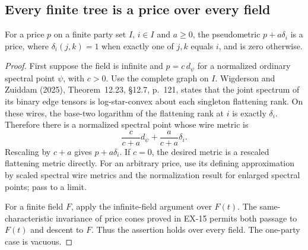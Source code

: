 \subsection{Every finite tree is a price over every field}

\begin{lemma}
\label{pg:pendant}
For a price $p$ on a finite party set $I$, $i\in I$ and $a\geq0$, the
pseudometric $p+a\delta_i$ is a price, where
$\delta_i(j,k)=1$ when exactly one of $j,k$ equals $i$, and is zero otherwise.
\end{lemma}
\begin{proof}
First suppose the field is infinite and $p=c\,d_\psi$ for a normalized
ordinary spectral point $\psi$, with $c>0$. Use the complete graph on $I$.
Wigderson and Zuiddam (2025), Theorem~12.23, \S12.7, p.~121, states that
the joint spectrum of its binary edge tensors is log-star-convex about
each singleton flattening rank. On these wires, the base-two logarithm of
the flattening rank at $i$ is exactly $\delta_i$. Therefore there is a
normalized spectral point whose wire metric is
\[
 \frac{c}{c+a}d_\psi+\frac{a}{c+a}\delta_i.
\]
Rescaling by $c+a$ gives $p+a\delta_i$. If $c=0$, the desired metric is
a rescaled flattening metric directly. For an arbitrary price, use its
defining approximation by scaled spectral wire metrics and the
normalization result for enlarged spectral points; pass to a limit.

For a finite field $F$, apply the infinite-field argument over $F(t)$.
The same-characteristic invariance of price cones proved in EX-15 permits
both passage to $F(t)$ and descent to $F$. Thus the assertion holds over
every field. The one-party case is vacuous.
\end{proof}

